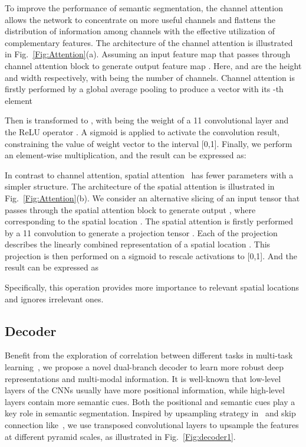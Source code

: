 \documentclass[10pt,twocolumn,letterpaper]{article}
\begin{document}
To improve the performance of semantic segmentation, the channel attention~\cite{ZhangYL:ECCV18} allows the network to concentrate on more useful channels and flattens the distribution of information among channels with the effective utilization of complementary features. The architecture of the channel attention is illustrated in Fig.~\ref{Fig:Attention}(a). Assuming an input feature map  that passes through channel attention block  to generate output feature map . Here,  and  are the height and width respectively, with  being the number of channels. Channel attention is firstly performed by a global average pooling to produce a vector  with its -th element

Then  is transformed to , with  being the weight of a 11 convolutional layer and the ReLU operator . A sigmoid  is applied to activate the convolution result, constraining the value of weight vector to the interval [0,1]. Finally, we perform an element-wise multiplication, and the result  can be expressed as:


In contrast to channel attention, spatial attention~\cite{Roy:MICCAI18,Hu:TPAMI20} has fewer parameters with a simpler structure. The architecture of the spatial attention is illustrated in Fig.~\ref{Fig:Attention}(b). We consider an alternative slicing of an input tensor  that passes through the spatial attention block  to generate output , where  corresponding to the spatial location . The spatial attention is firstly performed by a 11 convolution to generate a projection tensor . Each  of the projection describes the linearly combined representation of a spatial location . This projection is then performed on a sigmoid  to rescale activations to [0,1]. And the result  can be expressed as

Specifically, this operation provides more importance to relevant spatial locations and ignores irrelevant ones.


\subsection{Decoder}\label{sec:decoder}
Benefit from the exploration of correlation between different tasks in multi-task learning~\cite{Xu:CVPR18,Zhang:CVPR19, Zhou:CVPR20}, we propose a novel dual-branch decoder to learn more robust deep representations and multi-modal information. It is well-known that low-level layers of the CNNs usually have more positional information, while high-level layers contain more semantic cues. Both the positional and semantic cues play a key role in semantic segmentation. Inspired by upsampling strategy in~\cite{Hu:ICIP19} and skip connection like~\cite{He:CVPR2016}, we use transposed convolutional layers to upsample the features at different pyramid scales, as illustrated in Fig.~\ref{Fig:decoder1}.
\end{document}

